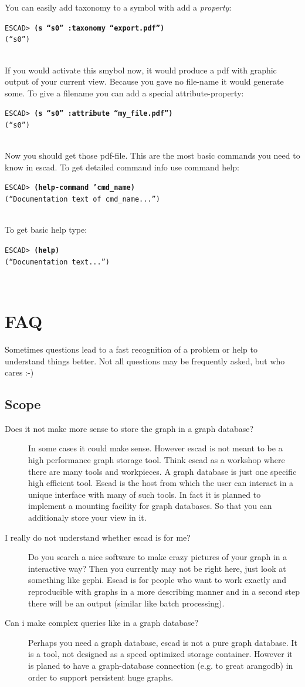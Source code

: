 \documentclass[a4paper, 12pt, openany]{scrbook}
\newcommand{\escadcmdline}[2]{\\\setlength{\fboxsep}{2pt}\colorbox{black!20}{\parbox{\textwidth}{\texttt{ESCAD> \textbf{#1}\\#2}}}\\}
\begin{document}
You can easily add taxonomy to a symbol with add a \emph{property}:
\escadcmdline{(s ``s0'' :taxonomy ``export.pdf'')}{(``s0'')}
If you would activate this smybol now, it would produce a pdf with graphic output of your current view. Because you gave no file-name it would generate some. To give a filename you can add a special attribute-property:
\escadcmdline{(s ``s0'' :attribute ``my\_file.pdf'')}{(``s0'')}
Now you should get those pdf-file.
This are the most basic commands you need to know in escad. To get detailed command info use command help:
\escadcmdline{(help-command 'cmd\_name)}{(``Documentation text of cmd\_name...'')}
To get basic help type:
\escadcmdline{(help)}{(``Documentation text...'')}
\section{FAQ}
Sometimes questions lead to a fast recognition of a problem or help to understand things better. Not all questions may be frequently asked, but who cares :-)
\subsection{Scope}
\begin{description}
\item[Does it not make more sense to store the graph in a graph database?] In some cases it could make sense. However escad is not meant to be a high performance graph storage tool. Think escad as a workshop where there are many tools and workpieces. A graph database is just one specific high efficient tool. Escad is the host from which the user can interact in a unique interface with many of such tools. In fact it is planned to implement a mounting facility for graph databases. So that you can additionaly store your view in it.
\item[I really do not understand whether escad is for me?] Do you search a nice software to make crazy pictures of your graph in a interactive way? Then you currently may not be right here, just look at something like gephi. Escad is for people who want to work exactly and reproducible with graphs in a more describing manner and in a second step there will be an output (similar like batch processing).
\item[Can i make complex queries like in a graph database?] Perhaps you need a graph database, escad is not a pure graph database. It is a tool, not designed as a speed optimized storage container. However it is planed to have a graph-database connection (e.g. to great arangodb) in order to support persistent huge graphs.
\end{description}
\end{document}
